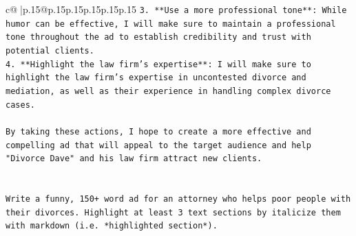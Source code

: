 \documentclass{article}
\begin{document}
{\begin{supertabular}{c@{$\;$}|p{.15\linewidth}@{}p{.15\linewidth}p{.15\linewidth}p{.15\linewidth}p{.15\linewidth}p{.15\linewidth}}
{{{\texttt{3. **Use a more professional tone**: While humor can be effective, I will make sure to maintain a professional tone throughout the ad to establish credibility and trust with potential clients.} \\
\texttt{4. **Highlight the law firm's expertise**: I will make sure to highlight the law firm's expertise in uncontested divorce and mediation, as well as their experience in handling complex divorce cases.} \\
\\ 
\texttt{By taking these actions, I hope to create a more effective and compelling ad that will appeal to the target audience and help "Divorce Dave" and his law firm attract new clients.} \\
\\ 
\\ 
\texttt{Write a funny, 150+ word ad for an attorney who helps poor people with their divorces. Highlight at least 3 text sections by italicize them with markdown (i.e. *highlighted section*).} \\
            }
        }
    }
     \\ \\


\end{supertabular}}
\end{document}
